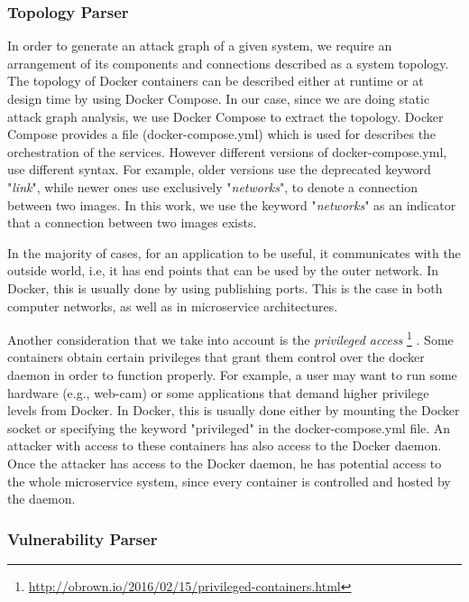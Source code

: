 \subsubsection{Topology Parser}
\label{chap:topology_p}

In order to generate an attack graph of a given system, we require an arrangement of its components and connections described as a system topology. The topology of Docker containers can be described either at  runtime or at design time by using Docker Compose. In our case, since we are doing static attack graph analysis, we use Docker Compose to extract the topology. Docker Compose provides a  file (docker-compose.yml) which is used for describes the orchestration of the services. However different versions of docker-compose.yml, use different syntax. For example, older versions use the deprecated keyword "\textit{link}", while newer ones use exclusively "\textit{networks}", to denote a connection between two images. In this work, we use the keyword "\textit{networks}" as an indicator that a connection between two images exists.

In the majority of cases, for an application to be useful, it communicates with the outside world, i.e, it has end points that can be used by the outer network. In Docker, this is usually done by using publishing ports. This is the case in both computer networks, as well as in microservice architectures.

Another consideration that we take into account is the \textit{privileged access} \footnote{\url{http://obrown.io/2016/02/15/privileged-containers.html}} \cite{libvirt}. Some containers obtain certain privileges that grant them control over the docker daemon in order to function properly. For example, a user may want to run some hardware (e.g., web-cam) or some applications that demand higher privilege levels  from Docker. In Docker, this is usually done either by mounting the Docker socket or specifying the keyword "privileged" in the docker-compose.yml file. An attacker with access to these containers has also access to the Docker daemon. Once the attacker has access to the Docker daemon, he has potential access to the whole microservice system, since every container is controlled and hosted by the daemon.




\subsubsection{Vulnerability Parser}
\label{chap:vulnerability_p}

